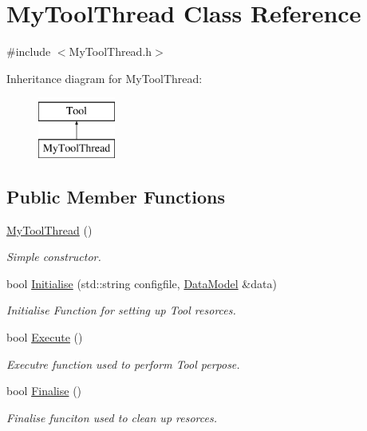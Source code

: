 \hypertarget{classMyToolThread}{\section{My\-Tool\-Thread Class Reference}
\label{classMyToolThread}
}


{\ttfamily \#include $<$My\-Tool\-Thread.\-h$>$}

Inheritance diagram for My\-Tool\-Thread\-:\begin{figure}[H]
\begin{center}
\leavevmode
\includegraphics[height=2.000000cm]{classMyToolThread}
\end{center}
\end{figure}
\subsection*{Public Member Functions}
\begin{DoxyCompactItemize}
\item 
\hypertarget{classMyToolThread_a66c6fc304a8d62436281598d988dd845}{\hyperlink{classMyToolThread_a66c6fc304a8d62436281598d988dd845}{My\-Tool\-Thread} ()}\label{classMyToolThread_a66c6fc304a8d62436281598d988dd845}

\begin{DoxyCompactList}\small\item\em Simple constructor. \end{DoxyCompactList}\item 
bool \hyperlink{classMyToolThread_adc7ab1ab74fc1564f07e52e63383d679}{Initialise} (std\-::string configfile, \hyperlink{classDataModel}{Data\-Model} \&data)
\begin{DoxyCompactList}\small\item\em Initialise Function for setting up Tool resorces. \end{DoxyCompactList}\item 
\hypertarget{classMyToolThread_a9b582cd202d5578682d57d973988df3c}{bool \hyperlink{classMyToolThread_a9b582cd202d5578682d57d973988df3c}{Execute} ()}\label{classMyToolThread_a9b582cd202d5578682d57d973988df3c}

\begin{DoxyCompactList}\small\item\em Executre function used to perform Tool perpose. \end{DoxyCompactList}\item 
\hypertarget{classMyToolThread_aa51e385684efcb19f1c039b96653070e}{bool \hyperlink{classMyToolThread_aa51e385684efcb19f1c039b96653070e}{Finalise} ()}\label{classMyToolThread_aa51e385684efcb19f1c039b96653070e}

\begin{DoxyCompactList}\small\item\em Finalise funciton used to clean up resorces. \end{DoxyCompactList}\end{DoxyCompactItemize}


